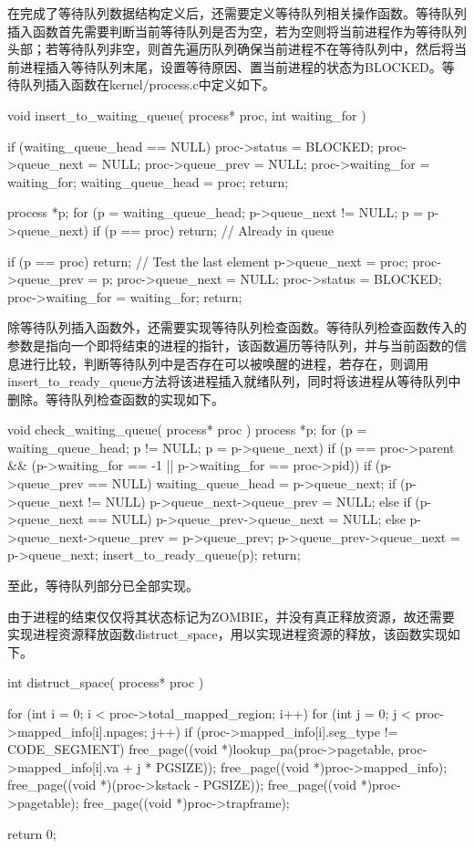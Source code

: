 在完成了等待队列数据结构定义后，还需要定义等待队列相关操作函数。等待队列插入函数首先需要判断当前等待队列是否为空，若为空则将当前进程作为等待队列头部；若等待队列非空，则首先遍历队列确保当前进程不在等待队列中，然后将当前进程插入等待队列末尾，设置等待原因、置当前进程的状态为BLOCKED。等待队列插入函数在kernel/process.c中定义如下。
\begin{cppcode}
void insert_to_waiting_queue( process* proc, int waiting_for ) {
    if (waiting_queue_head == NULL) {
        proc->status = BLOCKED;
        proc->queue_next = NULL;
        proc->queue_prev = NULL;
        proc->waiting_for = waiting_for;
        waiting_queue_head = proc;
        return;
    }
    
    process *p;
    for (p = waiting_queue_head; p->queue_next != NULL; p = p->queue_next)
        if (p == proc) return;  // Already in queue
        
    if (p == proc) return;      // Test the last element
    p->queue_next = proc;
    proc->queue_prev = p;
    proc->queue_next = NULL;
    proc->status = BLOCKED;
    proc->waiting_for = waiting_for;
    return;
}
\end{cppcode}

除等待队列插入函数外，还需要实现等待队列检查函数。等待队列检查函数传入的参数是指向一个即将结束的进程的指针，该函数遍历等待队列，并与当前函数的信息进行比较，判断等待队列中是否存在可以被唤醒的进程，若存在，则调用insert_to_ready_queue方法将该进程插入就绪队列，同时将该进程从等待队列中删除。等待队列检查函数的实现如下。
\begin{cppcode}
void check_waiting_queue( process* proc ) {
    process *p;
    for (p = waiting_queue_head; p != NULL; p = p->queue_next) {
        if (p == proc->parent && (p->waiting_for == -1 || p->waiting_for == proc->pid)) {
            if (p->queue_prev == NULL) {
                waiting_queue_head = p->queue_next;
                if (p->queue_next != NULL) p->queue_next->queue_prev = NULL;
            } else if (p->queue_next == NULL) {
                p->queue_prev->queue_next = NULL;
            } else {
                p->queue_next->queue_prev = p->queue_prev;
                p->queue_prev->queue_next = p->queue_next;
            }
            insert_to_ready_queue(p);
        }
    }
    return;
}
\end{cppcode}

至此，等待队列部分已全部实现。

由于进程的结束仅仅将其状态标记为ZOMBIE，并没有真正释放资源，故还需要实现进程资源释放函数distruct_space，用以实现进程资源的释放，该函数实现如下。
\begin{cppcode}
int distruct_space( process* proc ) {
    for (int i = 0; i < proc->total_mapped_region; i++) {
        for (int j = 0; j < proc->mapped_info[i].npages; j++) {
            if (proc->mapped_info[i].seg_type != CODE_SEGMENT)
                free_page((void *)lookup_pa(proc->pagetable, proc->mapped_info[i].va + j * PGSIZE));
        }
    }
    free_page((void *)proc->mapped_info);
    free_page((void *)(proc->kstack - PGSIZE));
    free_page((void *)proc->pagetable);
    free_page((void *)proc->trapframe);

    return 0;
}
\end{cppcode}


